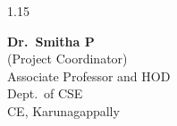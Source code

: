 \documentclass[12pt,a4paper]{report}
\begin{document}
\begin{spacing}{1.15}
\vspace*{1.5cm}

\begin{center}
\begin{minipage}[t]{0.5\textwidth}
	\centering
	\textbf{Dr.~Smitha P} \\[2pt]
	(Project Coordinator) \\[2pt]
	Associate Professor and HOD \\[2pt]
	Dept.\ of CSE \\[2pt]
	CE, Karunagappally
\end{minipage}
\end{center}

\end{spacing}
\end{document}
